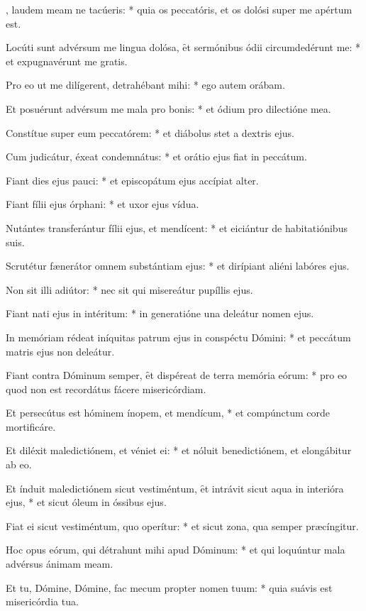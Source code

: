 \begin{psalmus}

, laudem meam ne tacúeris: * quia os peccatóris, et os dolósi super me apértum est.

Locúti sunt advérsum me lingua dolósa, \f et sermónibus ódii circumdedérunt me: * et expugnavérunt me gratis.

Pro eo ut me dilígerent, detrahébant mihi: * ego autem orábam.

Et posuérunt advérsum me mala pro bonis: * et ódium pro dilectióne mea.

Constítue super eum peccatórem: * et diábolus stet a dextris ejus.

Cum judicátur, éxeat condemnátus: * et orátio ejus fiat in peccátum.

Fiant dies ejus pauci: * et episcopátum ejus accípiat alter.

Fiant fílii ejus órphani: * et uxor ejus vídua.

Nutántes transferántur fílii ejus, et mendícent: * et eiciántur de habitatiónibus suis.

Scrutétur fænerátor omnem substántiam ejus: * et dirípiant aliéni labóres ejus.

Non sit illi adiútor: * nec sit qui misereátur pupíllis ejus.

Fiant nati ejus in intéritum: * in generatióne una deleátur nomen ejus.

In memóriam rédeat iníquitas patrum ejus in conspéctu Dómini: * et peccátum matris ejus non deleátur.

Fiant contra Dóminum semper, \f et dispéreat de terra memória eórum: * pro eo quod non est recordátus fácere misericórdiam.

Et persecútus est hóminem ínopem, et mendícum, * et compúnctum corde mortificáre.

Et diléxit maledictiónem, et véniet ei: * et nóluit benedictiónem, et elongábitur ab eo.

Et índuit maledictiónem sicut vestiméntum, \f et intrávit sicut aqua in interióra ejus, * et sicut óleum in óssibus ejus.

Fiat ei sicut vestiméntum, quo operítur: * et sicut zona, qua semper præcíngitur.

Hoc opus eórum, qui détrahunt mihi apud Dóminum: * et qui loquúntur mala advérsus ánimam meam.

Et tu, Dómine, Dómine, fac mecum propter nomen tuum: * quia suávis est misericórdia tua.


\end{psalmus}
